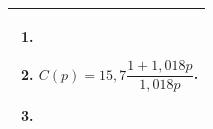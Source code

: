 \documentclass[10pt,fleqn]{article} %
\begin{document}
\begin{multicols}{2}
\noindent
\begin{tabular}{|p{.9\linewidth}|}
\hline
\begin{enumerate}
\item $\quad$
\item $C(p)=15,7\dfrac{1+1,018p}{1,018p}$.
\item $\quad$
\end{enumerate}\\
\hline
\end{tabular}



%
%
%
%
%
%

\end{multicols}
\end{document}
